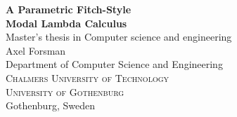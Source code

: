 \documentclass[12pt,twoside,openright]{report}
\numberwithin{equation}{chapter}
\numberwithin{figure}{chapter}
\numberwithin{table}{chapter}
\theoremstyle{definition}\newtheorem{definition}{Definition}
\newcommand{\multiLineTitle}[1]{A Parametric Fitch-Style \\[#1] Modal Lambda Calculus}
\begin{document}

\begin{titlepage}

\mbox{}
\vfill
\renewcommand{\familydefault}{\sfdefault}\normalfont

\textbf{\Huge \multiLineTitle{0.2cm}} \\[0.5cm]

Master's thesis in Computer science and engineering \\[1cm]
{\Large Axel Forsman} \\[2.9cm]

Department of Computer Science and Engineering \\
\textsc{Chalmers University of Technology} \\
\textsc{University of Gothenburg} \\
Gothenburg, Sweden \the\year
\end{titlepage}
\end{document}
